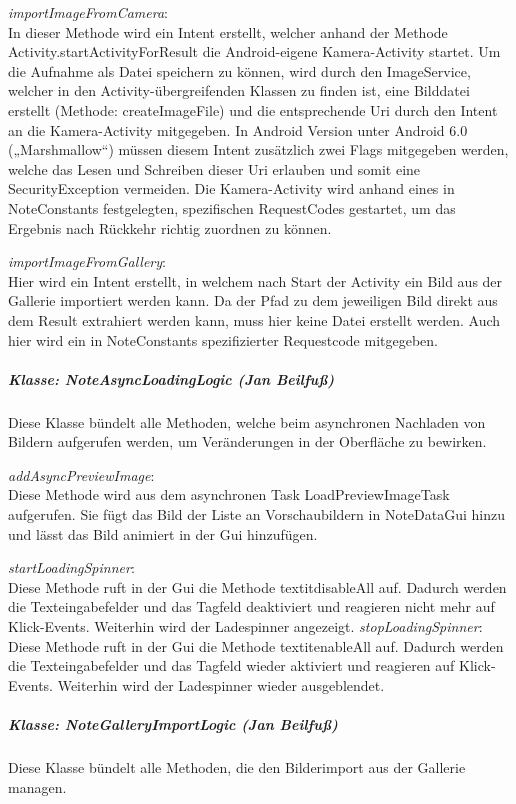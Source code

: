 \textit{importImageFromCamera}:\\
In dieser Methode wird ein Intent erstellt, welcher anhand der Methode Activity.startActivityForResult die Android-eigene Kamera-Activity startet. Um die Aufnahme als Datei speichern zu können, wird durch den ImageService, welcher in den Activity-übergreifenden Klassen zu finden ist, eine Bilddatei erstellt (Methode: createImageFile) und die entsprechende Uri durch den Intent an die Kamera-Activity mitgegeben. In Android Version unter Android 6.0 („Marshmallow“) müssen diesem Intent zusätzlich zwei Flags mitgegeben werden, welche das Lesen und Schreiben dieser Uri erlauben und somit eine SecurityException vermeiden.
Die Kamera-Activity wird anhand eines in NoteConstants festgelegten, spezifischen RequestCodes gestartet, um das Ergebnis nach Rückkehr richtig zuordnen zu können.

\textit{importImageFromGallery}:\\
Hier wird ein Intent erstellt, in welchem nach Start der Activity ein Bild aus der Gallerie importiert werden kann. Da der Pfad zu dem jeweiligen Bild direkt aus dem Result extrahiert werden kann, muss hier keine Datei erstellt werden. Auch hier wird ein in NoteConstants spezifizierter Requestcode mitgegeben. 

\subparagraph{Klasse: NoteAsyncLoadingLogic (Jan Beilfuß)}
Diese Klasse bündelt alle Methoden, welche beim asynchronen Nachladen von Bildern aufgerufen werden, um Veränderungen in der Oberfläche zu bewirken.

\textit{addAsyncPreviewImage}:\\
Diese Methode wird aus dem asynchronen Task LoadPreviewImageTask aufgerufen. Sie fügt das Bild der Liste an Vorschaubildern in NoteDataGui hinzu und lässt das Bild animiert in der Gui hinzufügen.

\textit{startLoadingSpinner}:\\
Diese Methode ruft in der Gui die Methode textit{disableAll} auf. Dadurch werden die Texteingabefelder und das Tagfeld deaktiviert und reagieren nicht mehr auf Klick-Events. Weiterhin wird der Ladespinner angezeigt.
\textit{stopLoadingSpinner}:\\
Diese Methode ruft in der Gui die Methode textit{enableAll} auf. Dadurch werden die Texteingabefelder und das Tagfeld wieder aktiviert und reagieren auf Klick-Events. Weiterhin wird der Ladespinner wieder ausgeblendet.

\subparagraph{Klasse: NoteGalleryImportLogic (Jan Beilfuß)}
Diese Klasse bündelt alle Methoden, die den Bilderimport aus der Gallerie managen.

